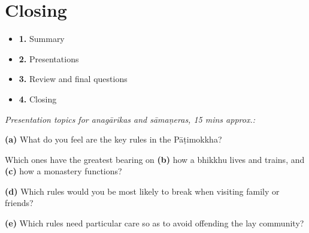 \chapter{Closing}

\begin{itemize}
\tightlist
\item
  \textbf{1.} Summary
\item
  \textbf{2.} Presentations
\item
  \textbf{3.} Review and final questions
\item
  \textbf{4.} Closing
\end{itemize}

\vspace{2\baselineskip}

\emph{Presentation topics for anagārikas and sāmaṇeras, 15 mins
approx.:}

\textbf{(a)} What do you feel are the key rules in the Pāṭimokkha?

Which ones have the greatest bearing on \textbf{(b)} how a bhikkhu lives
and trains, and \textbf{(c)} how a monastery functions?

\textbf{(d)} Which rules would you be most likely to break when visiting
family or friends?

\textbf{(e)} Which rules need particular care so as to avoid offending
the lay community?


